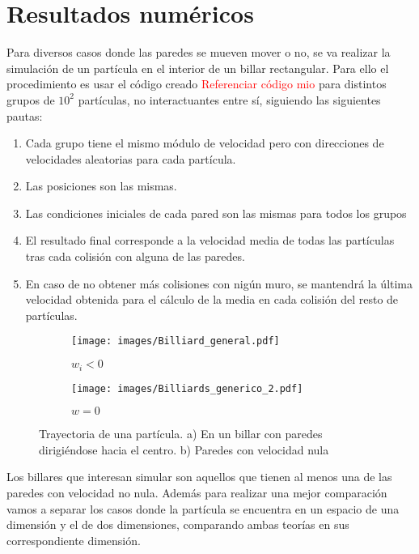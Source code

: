 \documentclass[11pt, spanish]{book}
\begin{document}
\chapter{Resultados numéricos}

Para diversos casos donde las paredes se mueven mover o no, se va realizar la simulación de un partícula en el interior de un billar rectangular. Para ello el procedimiento es usar el código creado \textcolor{red}{Referenciar código mio} para distintos grupos de \( 10^2 \) partículas, no interactuantes entre sí, siguiendo las siguientes pautas:

\begin{enumerate}
    \item Cada grupo tiene el mismo módulo de velocidad pero con direcciones de velocidades aleatorias para cada partícula.
    \item Las posiciones son las mismas.
    \item Las condiciones iniciales de cada pared son las mismas para todos los grupos
    \item El resultado final corresponde a la velocidad media de todas las partículas tras cada colisión con alguna de las paredes.
    \item En caso de no obtener más colisiones con nigún muro, se mantendrá la última velocidad obtenida para el cálculo de la media en cada colisión del resto de partículas.
\end{enumerate}

\begin{figure}[H]
    \begin{subfigure}[b]{0.5\textwidth}
        \centering
        \texttt{[image: images/Billiard\_general.pdf]}
        \caption{$w_i<0$}
        \label{fig:a}
    \end{subfigure}
    \hfill
    \begin{subfigure}[b]{0.5\textwidth}
        \centering
        \texttt{[image: images/Billiards\_generico\_2.pdf]}
        \caption{$w=0$}
        \label{fig:s}
    \end{subfigure}
    \caption{Trayectoria de una partícula. a) En un billar con paredes dirigiéndose hacia el centro. b) Paredes con velocidad nula}
\end{figure}


Los billares que interesan simular son aquellos que tienen al menos una de las paredes con velocidad no nula. Además para realizar una mejor comparación vamos a separar los casos donde la partícula se encuentra en un espacio de una dimensión y el de dos dimensiones, comparando ambas teorías en sus correspondiente dimensión.
\end{document}
